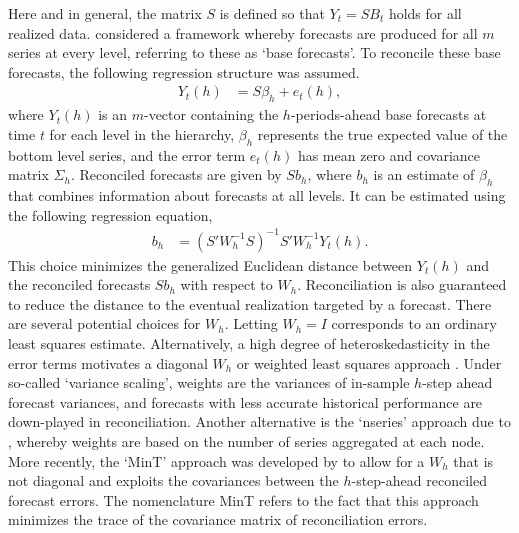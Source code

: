 \documentclass[a4paper,fleqn,11pt]{article}
\begin{document}
Here and in general, the matrix $S$ is defined so that $Y_t = S B_{t}$ holds for all realized data. \cite{Hyndman2011} considered a framework whereby forecasts are produced for all $m$ series at every level, referring to these as `base forecasts'. To reconcile these base forecasts, the following regression structure was assumed.
\begin{align}
Y_t(h) &= S\beta_{h} + e_t(h),
\label{eq:regstruct}
\end{align}
where $Y_t(h)$ is an $m$-vector containing the $h$-periods-ahead base forecasts at time $t$ for each level in the hierarchy, $\beta_{h}$ represents the true expected value of the bottom level series, and the error term $e_t(h)$ has mean zero and covariance matrix $\Sigma_h$. Reconciled forecasts are given by $Sb_{h}$, where $b_h$ is an estimate of $\beta_{h}$ that combines information about forecasts at all levels. It can be estimated using the following regression equation,
\begin{align}
\label{eq:reg}
b_{h} &= \left(S'W_h^{-1}S \right)^{-1} S'W_h^{-1}Y_t(h).
\end{align}
This choice minimizes the generalized Euclidean distance between $Y_t(h)$ and the reconciled forecasts $Sb_{h}$ with respect to $W_h$. Reconciliation is also guaranteed to reduce the distance to the eventual realization targeted by a forecast. There are several potential choices for $W_h$. Letting $W_h=I$ corresponds to an ordinary least squares estimate. Alternatively, a high degree of heteroskedasticity in the error terms motivates a diagonal $W_h$ or weighted least squares approach \citep{Hyndman2016}. Under so-called `variance scaling', weights are the variances of in-sample $h$-step ahead forecast variances, and forecasts with less accurate historical performance are down-played in reconciliation. Another alternative is the `nseries' approach due to \cite{Athanasopoulos2017}, whereby weights are based on the number of series aggregated at each node. More recently, the `MinT' approach was developed by \cite{Wickramasuriya2015} to allow for a $W_h$ that is not diagonal and exploits the covariances between the $h$-step-ahead reconciled forecast errors. The nomenclature MinT refers to the fact that this approach minimizes the trace of the covariance matrix of reconciliation errors.
\end{document}
